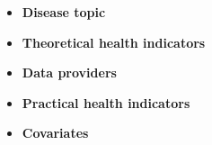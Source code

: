 \documentclass[landscape,paperwidth=84in,paperheight=48in,fontscale=.199]{baposter}
\begin{document}
\begin{poster}
{\begin{itemize}
\item \textbf{Disease topic}
\item \textbf{Theoretical health indicators}
\item \textbf{Data providers}
\item \textbf{Practical health indicators}
\item \textbf{Covariates}
\end{itemize}
}


 



\end{poster}
\end{document}
